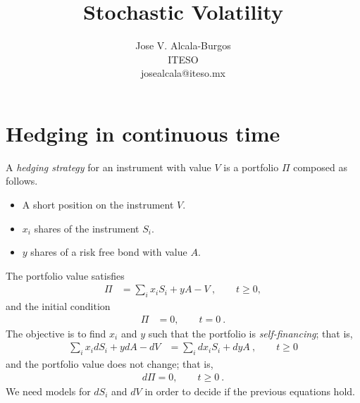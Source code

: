 \documentclass[10pt]{article}
\numberwithin{equation}{section}
\begin{document}
\title{Stochastic Volatility}
\author{Jose V. Alcala-Burgos \\
ITESO\\
josealcala@iteso.mx}

\maketitle

\begin{abstract}

\end{abstract}



\section{Hedging in continuous time}
A \emph{hedging strategy} for an instrument with value $V$ is a portfolio $\Pi$ composed as follows.
\begin{itemize}
\item A short position on the instrument $V$.
\item $x_i$ shares of the instrument $S_i$.
\item $y$ shares of a risk free bond with value $A$.
\end{itemize}
The portfolio value satisfies
\begin{equation}
	\begin{split}
	\Pi &= \sum_{i} x_i S_i + y A - V\:,\qquad t\geq0,
	\end{split}
\end{equation}
and the initial condition
\begin{equation*}
	\begin{split}
	\Pi &= 0,\qquad t=0\:.	
	\end{split}
\end{equation*}
The objective is to find $x_i$ and $y$ such that the portfolio is \emph{self-financing}; that is,
\begin{equation}\label{self}
	\begin{split}
	\sum_{i} x_i dS_i+y dA-dV&=\sum_{i} dx_i S_i +dy A\:,\qquad t\geq 0
	\end{split}
\end{equation}
and the portfolio value does not change; that is,
\begin{equation}\label{constant}
	\begin{split}
	d\Pi = 0,\qquad t\geq 0\:.
	\end{split}
\end{equation}
We need models for $dS_i$ and $dV$ in order to decide if the previous equations hold. 
\end{document}
